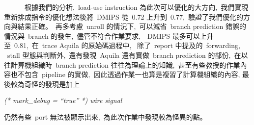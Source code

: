\documentclass{article}
\begin{document}
\begin{CJK*}{UTF8}{bsmi}
\begin{multicols}{2}
\begin{flushleft}
    \ \ \ \ \ \ 根據我們的分析,\ load-use instruction 為此次可以優化的大方向,\
    我們實現重新排成指令的優化想法後將\ DMIPS 從\ 0.72 上升到\ 0.77,\
    驗證了我們優化的方向與結果正確。\
    再多考慮\ unroll 的情況下,\
    可以減省\ branch prediction 錯誤的情況與\ branch 的發生,\ 
    儘管不符合作業要求,\
    \ DMIPS 最多可以上升至\ 0.81,\ 
    在\ trace Aquila 的原始碼過程中, \
    除了\ report 中提及的\ forwarding, \ stall  型態與判斷外,\
    還有發現\ Aquila 還有實做\ branch prediction 的部份,\
    在以往計算機組織時\ branch prediction 往往為理論上的知識,\
    甚至有些教授的作業內容也不包含\ pipeline 的實做,\
    因此透過作業一也算是複習了計算機組織的內容,\newline
    最後較為奇怪的發現是加上\newline
    \begin{center}
        \textit{(* mark\_debug = “true” *) wire signal}\newline    
    \end{center}
    仍然有些\ port 無法被顯示出來,\
    為此次作業中發現較為怪異的點。
    
\end{flushleft}



\end{multicols}

\end{CJK*}
\end{document}
